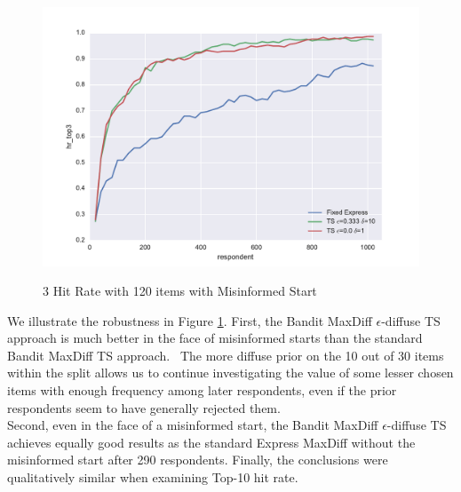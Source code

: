 \documentclass[nonblindrev]{informs3}
\begin{document}
\begin{figure}
\caption{3 Hit Rate with 120 items with Misinformed Start}
\includegraphics[width=1\textwidth]{plots/3hitrate120show3.pdf}
\label{fig:3hitmis}
\end{figure}
We illustrate the robustness in Figure \ref{fig:3hitmis}. First, the Bandit MaxDiff $\epsilon$-diffuse TS approach is much better in the face of misinformed starts than the standard Bandit MaxDiff TS approach.  The more diffuse prior on the 10 out of 30 items within the split allows us to continue investigating the value of some lesser chosen items with enough frequency among later respondents, even if the prior respondents seem to have generally rejected them.\\
Second, even in the face of a misinformed start, the Bandit MaxDiff $\epsilon$-diffuse TS achieves equally good results as the standard Express MaxDiff without the misinformed start after 290 respondents. Finally, the conclusions were qualitatively similar when examining Top-10 hit rate.\\
\end{document}
